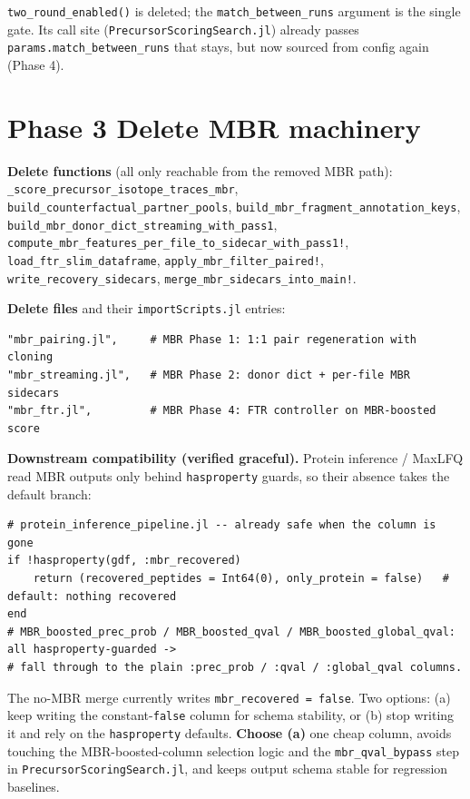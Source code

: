 \documentclass[10pt]{article}
\begin{document}
\texttt{two\_round\_enabled()} is deleted; the \texttt{match\_between\_runs} argument is the single
gate. Its call site (\texttt{PrecursorScoringSearch.jl}) already passes
\texttt{params.match\_between\_runs} \textemdash{} that stays, but now sourced from config again (Phase 4).

\section{Phase 3 \textemdash{} Delete MBR machinery}

\textbf{Delete functions} (all only reachable from the removed MBR path):
\texttt{\_score\_precursor\_isotope\_traces\_mbr}, \texttt{build\_counterfactual\_partner\_pools},
\texttt{build\_mbr\_fragment\_annotation\_keys}, \texttt{build\_mbr\_donor\_dict\_streaming\_with\_pass1},
\texttt{compute\_mbr\_features\_per\_file\_to\_sidecar\_with\_pass1!}, \texttt{load\_ftr\_slim\_dataframe},
\texttt{apply\_mbr\_filter\_paired!}, \texttt{write\_recovery\_sidecars},
\texttt{merge\_mbr\_sidecars\_into\_main!}.

\textbf{Delete files} and their \texttt{importScripts.jl} entries:
\begin{lstlisting}
"mbr_pairing.jl",     # MBR Phase 1: 1:1 pair regeneration with cloning
"mbr_streaming.jl",   # MBR Phase 2: donor dict + per-file MBR sidecars
"mbr_ftr.jl",         # MBR Phase 4: FTR controller on MBR-boosted score
\end{lstlisting}

\textbf{Downstream compatibility (verified graceful).} Protein inference / MaxLFQ read MBR outputs
only behind \texttt{hasproperty} guards, so their absence takes the default branch:
\begin{lstlisting}
# protein_inference_pipeline.jl -- already safe when the column is gone
if !hasproperty(gdf, :mbr_recovered)
    return (recovered_peptides = Int64(0), only_protein = false)   # default: nothing recovered
end
# MBR_boosted_prec_prob / MBR_boosted_qval / MBR_boosted_global_qval: all hasproperty-guarded ->
# fall through to the plain :prec_prob / :qval / :global_qval columns.
\end{lstlisting}

The no-MBR merge currently writes \texttt{mbr\_recovered = false}. Two options: (a) keep writing the
constant-\texttt{false} column for schema stability, or (b) stop writing it and rely on the
\texttt{hasproperty} defaults. \textbf{Choose (a)} \textemdash{} one cheap column, avoids touching the
MBR-boosted-column selection logic and the \texttt{mbr\_qval\_bypass} step in
\texttt{PrecursorScoringSearch.jl}, and keeps output schema stable for regression baselines.
\end{document}
